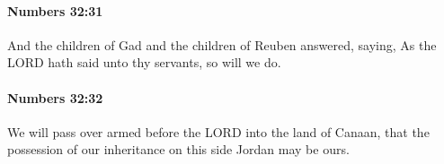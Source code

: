 		\paragraph{Numbers 32:31} %
			\label{NUMBERS-32-31}

			And the children of Gad and the children of Reuben answered, saying, As the LORD hath said unto thy servants, so will we do.


		\paragraph{Numbers 32:32} %
			\label{NUMBERS-32-32}

			We will pass over armed before the LORD into the land of Canaan, that the possession of our inheritance on this side Jordan may be ours.


